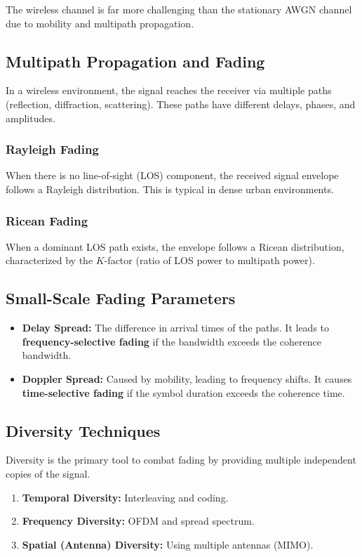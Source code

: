 
The wireless channel is far more challenging than the stationary AWGN channel due to mobility and multipath propagation.

\subsection{Multipath Propagation and Fading}
In a wireless environment, the signal reaches the receiver via multiple paths (reflection, diffraction, scattering). These paths have different delays, phases, and amplitudes.

\subsubsection{Rayleigh Fading}
When there is no line-of-sight (LOS) component, the received signal envelope follows a Rayleigh distribution. This is typical in dense urban environments.

\subsubsection{Ricean Fading}
When a dominant LOS path exists, the envelope follows a Ricean distribution, characterized by the $K$-factor (ratio of LOS power to multipath power).

\subsection{Small-Scale Fading Parameters}
\begin{itemize}
    \item \textbf{Delay Spread:} The difference in arrival times of the paths. It leads to \textbf{frequency-selective fading} if the bandwidth exceeds the coherence bandwidth.
    \item \textbf{Doppler Spread:} Caused by mobility, leading to frequency shifts. It causes \textbf{time-selective fading} if the symbol duration exceeds the coherence time.
\end{itemize}

\subsection{Diversity Techniques}
Diversity is the primary tool to combat fading by providing multiple independent copies of the signal.
\begin{enumerate}
    \item \textbf{Temporal Diversity:} Interleaving and coding.
    \item \textbf{Frequency Diversity:} OFDM and spread spectrum.
    \item \textbf{Spatial (Antenna) Diversity:} Using multiple antennas (MIMO).
\end{enumerate}

